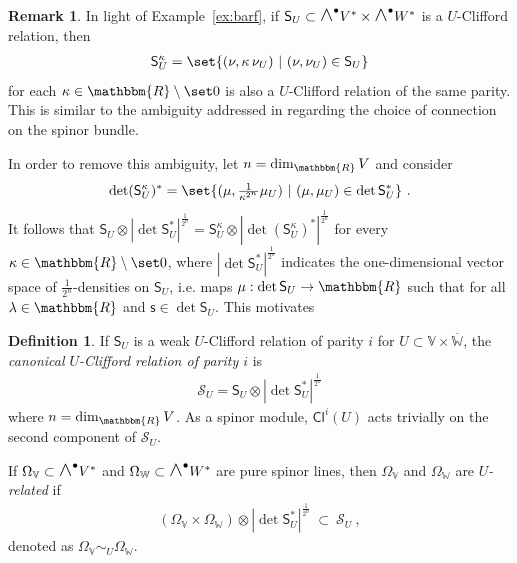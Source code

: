 \documentclass[a4paper, reqno, 11pt]{amsart}
\numberwithin{equation}{section}
\theoremstyle{definition}
\newtheorem{definition}[equation]{Definition}
\newtheorem{remark}[equation]{Remark}
\newcommand{\IR}{\mathbbm{R}}
\newcommand{\IV}{\mathbb{V}}
\newcommand{\IW}{\mathbb{W}}
\newcommand{\Cl}{\mathsf{Cl}}
\newcommand{\cS}{{\mathcal S}}
\newcommand{\sfS}{{\mathsf{S}}}
\newcommand{\sfs}{{\mathsf{s}}}
\newcommand{\midwedge}{\text {\Large$\wedge$}}
\theoremstyle{remark}
\begin{document}
\begin{remark}\label{rem:kappa}
    In light of Example~\ref{ex:barf}, if $\sfS_U\subset \midwedge^\bullet V^* \times \midwedge^\bullet W^*$ is a $U$-Clifford relation, then
\begin{align}
    \sfS_U^\kappa = \set{(\nu, \kappa \, \nu_U) \ \vert \  (\nu, \nu_U) \in \sfS_U}
\end{align}
 for each $\kappa \in \IR \setminus \set 0$ is also a $U$-Clifford relation of the same parity. 
This is similar to the ambiguity addressed in \cite[Part~II]{Cortes:2019roa} regarding the choice of connection on the spinor bundle.

In order to remove this ambiguity, let $n=\dim_\IR V$ and consider
\begin{align}
    \det (\sfS_U^\kappa)^* = \set{(\mu, \tfrac{1}{\kappa^{2^n}} \mu_U) 
 \ \vert \ (\mu, \mu_U) \in \det \sfS_U^*} \ .
\end{align}
It follows that $\sfS_U \otimes |\det \sfS_U^*|^{\frac{1}{2^n}} = \sfS_U^\kappa \otimes |\det (\sfS_U^\kappa)^*|^{\frac{1}{2^n}}$ for every $\kappa \in \IR \setminus \set 0$, where $|\det \sfS_U^*|^{\frac{1}{2^n}}$ indicates the one-dimensional vector space of $\frac1{2^n}$-densities on $\sfS_U$, i.e. maps $\mu:\det\sfS_U\to\IR$ such that \smash{$\mu(\lambda\,\sfs) = |\lambda|^{\frac1{2^n}}\,\mu(\sfs)$} for all $\lambda\in\IR$ and $\sfs\in\det \sfS_U$. This motivates
\end{remark}

\begin{definition}\label{def:canonicalRclifford}
    If $\sfS_U$ is a weak $U$-Clifford relation of parity $i$ for $U \subset \IV \times \overline{\IW}$, the \emph{canonical $U$-Clifford relation of parity $i$} is
    \begin{align}
    \cS_U = \sfS_U \otimes |\det \sfS_U^* |^{\frac{1}{2^n}}
\end{align}
where $n = \dim_\IR V$. As a spinor module, $\Cl^i(U)$ acts trivially on the second component of $\cS_U$.

If $\Omega_\IV \subset \midwedge^\bullet V^*$ and $\Omega_\IW \subset \midwedge^\bullet W^*$ are pure spinor lines, then $\Omega_\IV$ and $\Omega_\IW$ are \emph{$U$-related} if
\begin{align}
    (\Omega_\IV \times \Omega_\IW)\otimes |\det \sfS_U^* |^{\frac{1}{2^n}} \ \subset \ \cS_U \ ,
\end{align}
 denoted as $\Omega_\IV \sim_U \Omega_\IW$.
\end{definition}
\end{document}

